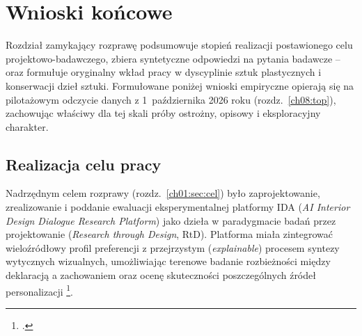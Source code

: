 \chapter{Wnioski końcowe}
\label{ch10:top}

Rozdział zamykający rozprawę podsumowuje stopień realizacji postawionego celu projektowo-badawczego, zbiera syntetyczne odpowiedzi na pytania badawcze -- oraz formułuje oryginalny wkład pracy w dyscyplinie sztuk plastycznych i konserwacji dzieł sztuki. Formułowane poniżej wnioski empiryczne opierają się na pilotażowym odczycie danych z 1~października 2026 roku (rozdz.~\ref{ch08:top}), zachowując właściwy dla tej skali próby ostrożny, opisowy i eksploracyjny charakter.

\section{Realizacja celu pracy}
\label{ch10:sec:cel}

Nadrzędnym celem rozprawy (rozdz.~\ref{ch01:sec:cel}) było zaprojektowanie, zrealizowanie i poddanie ewaluacji eksperymentalnej platformy IDA (\emph{AI Interior Design Dialogue Research Platform}) jako dzieła w paradygmacie badań przez projektowanie (\emph{Research through Design}, RtD). Platforma miała zintegrować wieloźródłowy profil preferencji z przejrzystym (\emph{explainable}) procesem syntezy wytycznych wizualnych, umożliwiając terenowe badanie rozbieżności między deklaracją a zachowaniem oraz ocenę skuteczności poszczególnych źródeł personalizacji \footcite{idaPlatform2026}.

